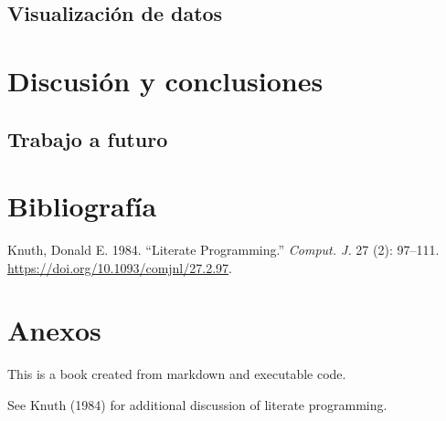 \documentclass[
  letterpaper,
  DIV=11,
  numbers=noendperiod]{scrreprt}
\newlength{\cslhangindent}
\newenvironment{CSLReferences}[2] %
 {\begin{list}{}{%
  \setlength{\itemindent}{0pt}
  \setlength{\leftmargin}{0pt}
  \setlength{\parsep}{0pt}
  \ifodd #1
   \setlength{\leftmargin}{\cslhangindent}
   \setlength{\itemindent}{-1\cslhangindent}
  \fi
  \setlength{\itemsep}{#2\baselineskip}}}
 {\end{list}}
\begin{document}
\section{Visualización de datos}\label{visualizaciuxf3n-de-datos}


\chapter{Discusión y conclusiones}\label{discusiuxf3n-y-conclusiones}

\section{Trabajo a futuro}\label{trabajo-a-futuro}


\chapter*{Bibliografía}\label{bibliografuxeda}


\label{refs}
\begin{CSLReferences}{1}{0}
Knuth, Donald E. 1984. {``Literate Programming.''} \emph{Comput. J.} 27
(2): 97--111. \url{https://doi.org/10.1093/comjnl/27.2.97}.

\end{CSLReferences}


\chapter*{Anexos}\label{anexos}


This is a book created from markdown and executable code.

See Knuth (1984) for additional discussion of literate programming.
\end{document}
